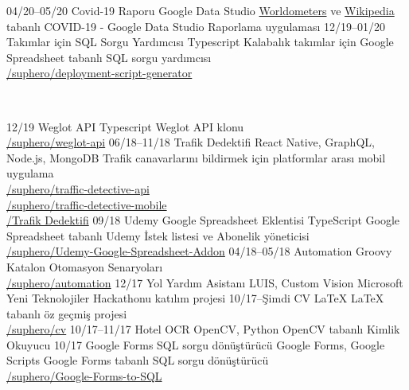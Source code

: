 \documentclass[]{../friggeri-cv} %
\begin{document}
\begin{entrylist}

\entry
{04/20--05/20}
{Covid-19 Raporu}
{Google Data Studio}
{\href{https://www.worldometers.info/coronavirus}{Worldometers} ve \href{https://en.wikipedia.org/wiki/COVID-19_pandemic}{Wikipedia} tabanlı COVID-19 - Google Data Studio Raporlama uygulaması}
\entry
{12/19--01/20}
{Takımlar için SQL Sorgu Yardımcısı}
{Typescript}
{Kalabalık takımlar için Google Spreadsheet tabanlı SQL sorgu yardımcısı
\\\href{https://github.com/suphero/deployment-script-generator}{\faGithub/suphero/deployment-script-generator}}
\end{entrylist}
\\
\begin{entrylist}
\entry
{12/19}
{Weglot API}
{Typescript}
{Weglot API klonu
\\\href{https://github.com/suphero/weglot-api}{\faGithub/suphero/weglot-api}}
\entry
{06/18--11/18}
{Trafik Dedektifi}
{React Native, GraphQL, Node.js, MongoDB}
{Trafik canavarlarını bildirmek için platformlar arası mobil uygulama
\\\href{https://github.com/suphero/traffic-detective-api}{\faGithub/suphero/traffic-detective-api}
\\\href{https://github.com/suphero/traffic-detective-mobile}{\faGithub/suphero/traffic-detective-mobile}
\\\href{https://play.google.com/store/apps/details?id=com.harunsokullu.trafficdetective}{\faAndroid/Trafik Dedektifi}}
\entry
{09/18}
{Udemy Google Spreadsheet Eklentisi}
{TypeScript}
{Google Spreadsheet tabanlı Udemy İstek listesi ve Abonelik yöneticisi
\\\href{https://github.com/suphero/Udemy-Google-Spreadsheet-Addon}{\faGithub/suphero/Udemy-Google-Spreadsheet-Addon}}
\entry
{04/18--05/18}
{Automation}
{Groovy}
{Katalon Otomasyon Senaryoları
\\\href{https://github.com/suphero/automation}{\faGithub/suphero/automation}}
\entry
{12/17}
{Yol Yardım Asistanı}
{LUIS, Custom Vision}
{Microsoft Yeni Teknolojiler Hackathonu katılım projesi}
\entry
{10/17--Şimdi}
{CV}
{\LaTeX}
{LaTeX tabanlı öz geçmiş projesi
\\\href{https://github.com/suphero/cv}{\faGithub/suphero/cv}}
\entry
{10/17--11/17}
{Hotel OCR}
{OpenCV, Python}
{OpenCV tabanlı Kimlik Okuyucu}
\entry
{10/17}
{Google Forms SQL sorgu dönüştürücü}
{Google Forms, Google Scripts}
{Google Forms tabanlı SQL sorgu dönüştürücü
\\\href{https://github.com/suphero/Google-Forms-to-SQL}{\faGithub/suphero/Google-Forms-to-SQL}}

\end{entrylist}
\end{document}
